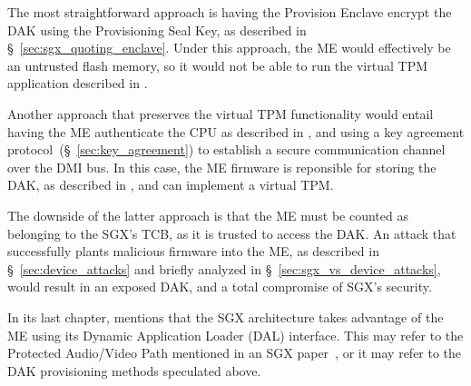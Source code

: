 The most straightforward approach is having the Provision Enclave encrypt the
DAK using the Provisioning Seal Key, as described in
\S~\ref{sec:sgx_quoting_enclave}. Under this approach, the ME would effectively
be an untrusted flash memory, so it would not be able to run the virtual TPM
application described in \cite{ruan2014intelme}.

Another approach that preserves the virtual TPM functionality would entail
having the ME authenticate the CPU as described in \cite{costan2011spchip}, and
using a key agreement protocol~(\S~\ref{sec:key_agreement}) to establish a
secure communication channel over the DMI bus. In this case, the ME firmware is
reponsible for storing the DAK, as described in \cite{ruan2014intelme}, and
can implement a virtual TPM.

The downside of the latter approach is that the ME must be counted as belonging
to the SGX's TCB, as it is trusted to access the DAK. An attack that
successfully plants malicious firmware into the ME, as described in
\S~\ref{sec:device_attacks} and briefly analyzed in
\S~\ref{sec:sgx_vs_device_attacks}, would result in an exposed DAK, and a total
compromise of SGX's security.


In its last chapter, \cite{ruan2014intelme} mentions that the SGX architecture
takes advantage of the ME using its Dynamic Application Loader (DAL) interface.
This may refer to the Protected Audio/Video Path mentioned in an SGX
paper~\cite{hoekstra2013sgx}, or it may refer to the DAK provisioning methods
speculated above.
